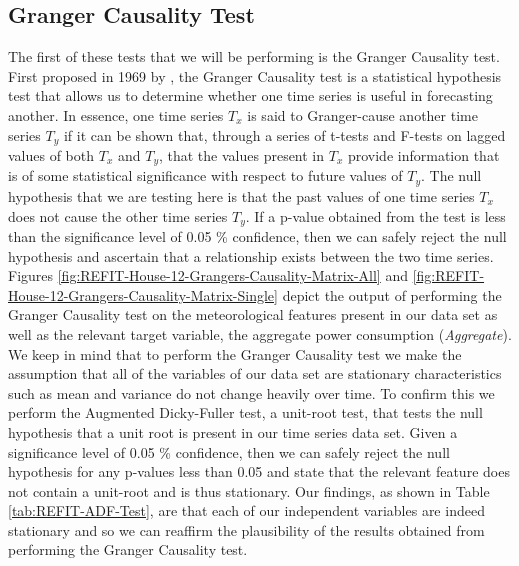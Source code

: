 \subsection{Granger Causality Test}
\label{subsec:Exploratory-Data-Analysis:Causality-and-Correlation:Grangers-Causality-Test}
The first of these tests that we will be performing is the Granger Causality test. First proposed in 1969 by \citet{Granger}, the Granger Causality test is a statistical hypothesis test that allows us to determine whether one time series is useful in forecasting another. In essence, one time series $T_x$ is said to Granger-cause another time series $T_y$ if it can be shown that, through a series of t-tests and F-tests on lagged values of both $T_x$ and $T_y$, that the values present in $T_x$ provide information that is of some statistical significance with respect to future values of $T_y$. The null hypothesis that we are testing here is that the past values of one time series $T_x$ does not cause the other time series $T_y$. If a p-value obtained from the test is less than the significance level of 0.05 \% confidence, then we can safely reject the null hypothesis and ascertain that a relationship exists between the two time series. Figures \ref{fig:REFIT-House-12-Grangers-Causality-Matrix-All} and \ref{fig:REFIT-House-12-Grangers-Causality-Matrix-Single} depict the output of performing the Granger Causality test on the meteorological features present in our data set as well as the relevant target variable, the aggregate power consumption (\textit{Aggregate}). We keep in mind that to perform the Granger Causality test we make the assumption that all of the variables of our data set are stationary \ie characteristics such as mean and variance do not change heavily over time. To confirm this we perform the Augmented Dicky-Fuller test, a unit-root test, that tests the null hypothesis that a unit root is present in our time series data set. Given a significance level of 0.05 \% confidence, then we can safely reject the null hypothesis for any p-values less than 0.05 and state that the relevant feature does not contain a unit-root and is thus stationary. Our findings, as shown in Table \ref{tab:REFIT-ADF-Test}, are that each of our independent variables are indeed stationary and so we can reaffirm the plausibility of the results obtained from performing the Granger Causality test.

